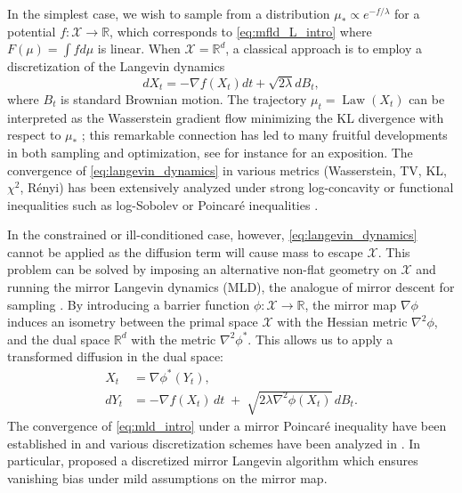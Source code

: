\documentclass{article}
\begin{document}
In the simplest case, we wish to sample from a distribution $\mu_*\propto e^{-f/\lambda}$ for a potential $f:\mathcal{X}\to\mathbb{R}$, which corresponds to \eqref{eq:mfld_L_intro} where $F(\mu)=\int fd\mu$ is linear. When $\mathcal{X}=\mathbb{R}^d$, a classical approach is to employ a discretization of the Langevin dynamics
\begin{equation}
dX_t = -\nabla f(X_t)dt + \sqrt{2\lambda}dB_t,\label{eq:langevin_dynamics}    
\end{equation}
where $B_t$ is standard Brownian motion. The trajectory $\mu_t = \operatorname{Law}(X_t)$ can be interpreted as the Wasserstein gradient flow minimizing the KL divergence with respect to $\mu_*$ \citep{Jordan98}; this remarkable connection has led to many fruitful developments in both sampling and optimization, see for instance \citet{Wibisono2018sampling,chewi2023logconcavesampling} for an exposition. The convergence of \eqref{eq:langevin_dynamics} in various metrics (Wasserstein, TV, KL, $\chi^2$, R\'enyi) has been extensively analyzed under strong log-concavity or functional inequalities such as log-Sobolev or Poincar\'e
inequalities \citep{Wibisono2018sampling,wibisono2019proximal,vempalawibisono,durmus17,durmus19,li2021,chewi22,mousavi2023}.

In the constrained or ill-conditioned case, however, \eqref{eq:langevin_dynamics} cannot be applied as the diffusion term will cause mass to escape $\mathcal{X}$. This problem can be solved by imposing an alternative non-flat geometry on $\mathcal{X}$ and running the mirror Langevin dynamics (MLD), the analogue of mirror descent for sampling \citep{hsieh2018,zhang2020wasserstein}. By introducing a barrier function $\phi:\mathcal{X}\to\mathbb{R}$, the mirror map $\nabla\phi$ induces an isometry between the primal space $\mathcal{X}$ with the Hessian metric $\nabla^2\phi$, and the dual space $\mathbb{R}^d$ with the metric $\nabla^2\phi^*$. This allows us to apply a transformed diffusion in the dual space:
\begin{equation}\label{eq:mld_intro}
\begin{split}
X_t &= \nabla\phi^*(Y_t),\\
dY_t &= -\nabla f(X_t)\,dt \;+\; \sqrt{2\lambda \nabla^2\phi(X_t)}\, dB_t.
\end{split}
\end{equation}
The convergence of \eqref{eq:mld_intro} under a mirror Poincar\'{e} inequality have been established in \citet{chewi2020mld} and various discretization schemes have been analyzed in \citet{zhang2020wasserstein,jiang2021mirror,ahn2021efficient,li2022mirror}. In particular, \citet{ahn2021efficient} proposed a discretized mirror Langevin algorithm which ensures vanishing bias under mild assumptions on the mirror map.
\end{document}
